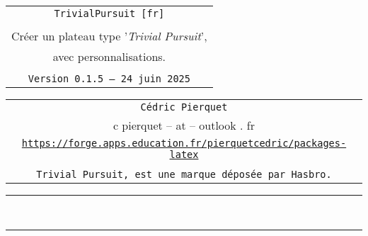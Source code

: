 \documentclass[11pt,a4paper]{ltxdoc}
\def\TPversion{0.1.5}
\def\TPdate{24 juin 2025}
\begin{document}
\pagestyle{fancy}

\thispagestyle{empty}

\begin{center}
	\begin{minipage}{0.88\linewidth}
	\begin{tcolorbox}[colframe=yellow,colback=yellow!15]
		\begin{center}
			\begin{tabular}{c}
				{\Huge \texttt{TrivialPursuit [fr]}}\\
				\\
				{\LARGE Créer un plateau type '\textit{Trivial Pursuit}',} \\
				{\LARGE avec personnalisations.} \\
				\\
				{\small \texttt{Version \TPversion{} -- \TPdate}}
		\end{tabular}
		\end{center}
	\end{tcolorbox}
\end{minipage}
\end{center}

\begin{center}
	\begin{tabular}{c}
	\texttt{Cédric Pierquet}\\
	{\ttfamily c pierquet -- at -- outlook . fr}\\
	\texttt{\url{https://forge.apps.education.fr/pierquetcedric/packages-latex}} \\
	\\
	\texttt{Trivial Pursuit\texttrademark, est une marque déposée par Hasbro.}
\end{tabular}
\end{center}

\hrule

\vfill

\begin{tcolorbox}[colframe=lightgray,colback=lightgray!5]
\PlateauTrivialPursuit
\end{tcolorbox}

\vfill~

\pagebreak


\hypertarget{matoc}{}

\tableofcontents

\vspace*{5mm}

\hrule

\vspace*{5mm}
\end{document}
